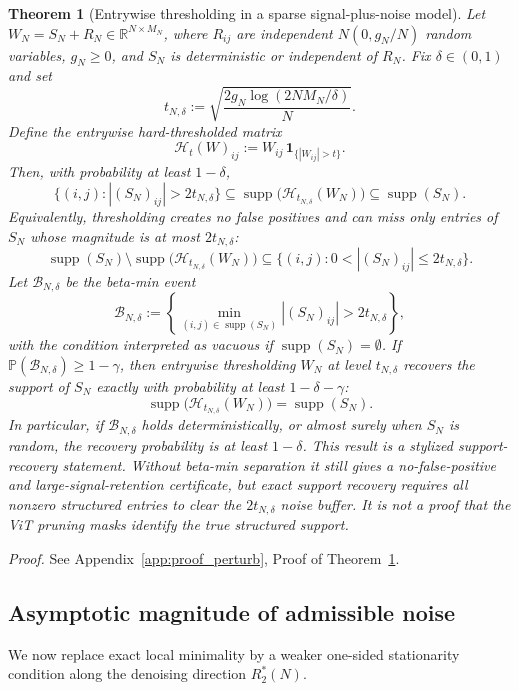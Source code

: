 \documentclass[11pt]{article}
\theoremstyle{plain}
\newtheorem{thm}{Theorem}[section]
\theoremstyle{definition}
\theoremstyle{remark}
\newcommand{\R}{\mathbb{R}}
\newcommand{\PP}{\mathbb{P}}
\newcommand{\1}{\mathbf{1}}
\newcommand{\proofloc}[1]{\par\noindent\emph{Proof.} #1\par}
\begin{document}
\begin{thm}[Entrywise thresholding in a sparse signal-plus-noise model]
\label{thm:entrywise_threshold_support}
Let \(W_N=S_N+R_N\in\R^{N\times M_N}\), where \(R_{ij}\) are independent \(N(0,g_N/N)\) random variables, \(g_N\ge0\), and \(S_N\) is deterministic or independent of \(R_N\). Fix \(\delta\in(0,1)\) and set
\[
t_{N,\delta}
:=
\sqrt{\frac{2g_N\log(2NM_N/\delta)}{N}}.
\]
Define the entrywise hard-thresholded matrix
\[
\mathcal H_t(W)_{ij}:=W_{ij}\,\mathbf 1_{\{|W_{ij}|>t\}}.
\]
Then, with probability at least \(1-\delta\),
\[
\{(i,j): |(S_N)_{ij}|>2t_{N,\delta}\}
\subseteq
\operatorname{supp}\big(\mathcal H_{t_{N,\delta}}(W_N)\big)
\subseteq
\operatorname{supp}(S_N).
\]
Equivalently, thresholding creates no false positives and can miss only entries of \(S_N\) whose magnitude is at most \(2t_{N,\delta}\):
\[
\operatorname{supp}(S_N)\setminus
\operatorname{supp}\big(\mathcal H_{t_{N,\delta}}(W_N)\big)
\subseteq
\{(i,j):0< |(S_N)_{ij}|\le2t_{N,\delta}\}.
\]
Let \(\mathcal B_{N,\delta}\) be the beta-min event
\[
\mathcal B_{N,\delta}:=
\left\{
\min_{(i,j)\in\operatorname{supp}(S_N)} |(S_N)_{ij}|>2t_{N,\delta}
\right\},
\]
with the condition interpreted as vacuous if \(\operatorname{supp}(S_N)=\emptyset\). If \(\PP(\mathcal B_{N,\delta})\ge1-\gamma\), then entrywise thresholding \(W_N\) at level \(t_{N,\delta}\) recovers the support of \(S_N\) exactly with probability at least \(1-\delta-\gamma\):
\[
\operatorname{supp}\big(\mathcal H_{t_{N,\delta}}(W_N)\big)
=
\operatorname{supp}(S_N).
\]
In particular, if \(\mathcal B_{N,\delta}\) holds deterministically, or almost surely when \(S_N\) is random, the recovery probability is at least \(1-\delta\).
This result is a stylized support-recovery statement. Without beta-min separation it still gives a no-false-positive and large-signal-retention certificate, but exact support recovery requires all nonzero structured entries to clear the \(2t_{N,\delta}\) noise buffer. It is not a proof that the ViT pruning masks identify the true structured support.
\end{thm}
\proofloc{See Appendix~\ref{app:proof_perturb}, Proof of Theorem~\ref{thm:entrywise_threshold_support}.}

\subsection{Asymptotic magnitude of admissible noise}

We now replace exact local minimality by a weaker one-sided stationarity condition along the denoising direction \(R_2^*(N)\).
\end{document}
